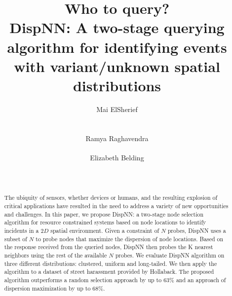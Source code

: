 \documentclass{acm_proc_article-sp}
\begin{document}
\title{Who to query? \\DispNN: A two-stage querying algorithm for identifying events with variant/unknown spatial distributions }
\author{
%
%
\alignauthor
Mai ElSherief\\
 \\
 \\
 \alignauthor
Ramya Raghavendra\\
 \\
\alignauthor
Elizabeth Belding\\
\\
 \\
}
\maketitle
\begin{abstract}
The ubiquity of sensors, whether devices or humans, and the resulting explosion of critical applications have resulted in 
the need to address a variety of new opportunities and challenges. In this paper, we propose DispNN: a two-stage node selection algorithm for resource constrained systems based on node locations to identify incidents in a $2D$ spatial environment. Given a constraint of $N$ probes, DispNN uses a subset of $N$ to probe nodes that maximize the dispersion of node locations. Based on the response received from the queried nodes, DispNN then probes the K nearest neighbors using the rest of the available $N$ probes. We evaluate DispNN algorithm on three different distributions: clustered, uniform and long-tailed. We then apply the algorithm to a dataset of street harassment provided by Hollaback. The proposed algorithm outperforms a random selection approach by up to $63\%$ and an approach of dispersion maximization by up to $68\%$.
\end{abstract}
\end{document}

